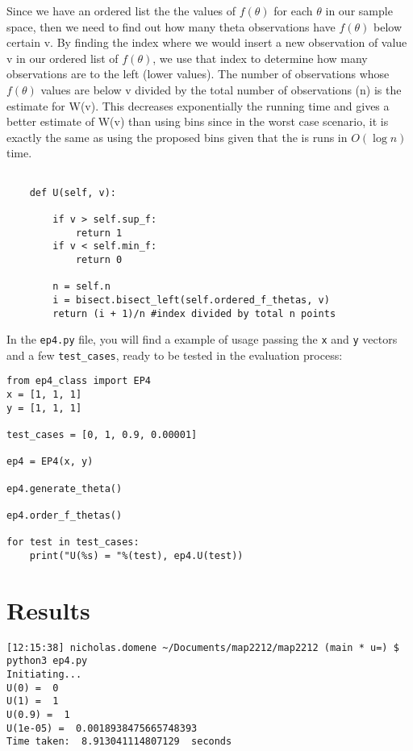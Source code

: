 \documentclass[12pt]{article}
\begin{document}
Since we have an ordered list the the values of $f(\theta)$ for each $\theta$ in our sample space, then we need to find out how many theta observations have $f(\theta)$ below certain v. By finding the index where we would insert a new observation of value v in our  ordered list of $f(\theta)$, we use that index to determine how many observations are to the left (lower values). The number of observations whose $f(\theta)$ values are below v divided by the  total number of observations (n) is the estimate for W(v). This decreases exponentially the running time and gives a better estimate of W(v) than using bins since in the worst case scenario, it is exactly the same as using the proposed bins given that the is runs in $O(\log n)$ time. \\
\begin{lstlisting}

	def U(self, v):

		if v > self.sup_f:
			return 1
		if v < self.min_f:
			return 0

		n = self.n
		i = bisect.bisect_left(self.ordered_f_thetas, v)
		return (i + 1)/n #index divided by total n points
\end{lstlisting}
In the \texttt{ep4.py} file, you will find a example of usage passing the \texttt{x} and \texttt{y} vectors and a few \texttt{test\_cases}, ready to be tested in the evaluation process:
\begin{lstlisting}
from ep4_class import EP4
x = [1, 1, 1]
y = [1, 1, 1]

test_cases = [0, 1, 0.9, 0.00001]

ep4 = EP4(x, y)

ep4.generate_theta()

ep4.order_f_thetas()

for test in test_cases:
	print("U(%s) = "%(test), ep4.U(test))
\end{lstlisting}

\section*{Results}
\begin{lstlisting}
[12:15:38] nicholas.domene ~/Documents/map2212/map2212 (main * u=) $ python3 ep4.py 
Initiating...
U(0) =  0
U(1) =  1
U(0.9) =  1
U(1e-05) =  0.0018938475665748393
Time taken:  8.913041114807129  seconds
\end{lstlisting}
\end{document}
